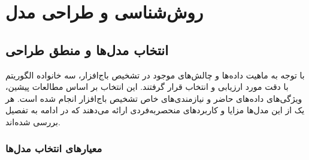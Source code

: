 \chapter{روش‌شناسی و طراحی مدل}

\section{انتخاب مدل‌ها و منطق طراحی}
با توجه به ماهیت داده‌ها و چالش‌های موجود در تشخیص باج‌افزار، سه خانواده الگوریتم با دقت مورد ارزیابی و انتخاب قرار گرفتند. این انتخاب بر اساس مطالعات پیشین، ویژگی‌های داده‌های حاضر و نیازمندی‌های خاص تشخیص باج‌افزار انجام شده است. هر یک از این مدل‌ها مزایا و کاربردهای منحصربه‌فردی ارائه می‌دهند که در ادامه به تفصیل بررسی شده‌اند.

\subsection{معیارهای انتخاب مدل‌ها}
